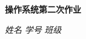 \begin{center}
  \LARGE \bf 操作系统第二次作业
\end{center}

\begin{center}
  \emph{姓名} \underline{\makebox[7em][c]{\name}}
  \emph{学号} \underline{\makebox[12em][c]{\studentNum}}
  \emph{班级} \underline{\makebox[15em][c]{\class}}\\
\end{center}
